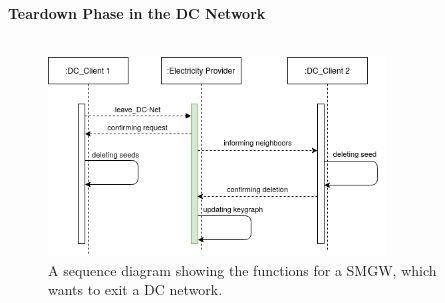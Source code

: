 \\
\\
\textbf{Teardown Phase in the DC Network}
\\
\\
\begin{figure}[tbp]
  \centering
  \includegraphics[width=0.8\textwidth]{images/Exit.png}
  \caption[Sequence Diagram Exiting]{A sequence diagram showing the functions for a SMGW, which wants to exit a DC network.}
  \label{fig:Exit}
\end{figure}
